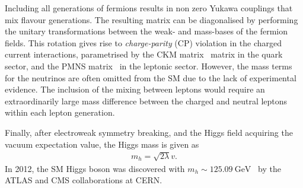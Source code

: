 Including all generations of fermions results in non zero Yukawa couplings that mix flavour generations. The resulting matrix can be diagonalised by performing the unitary transformations between the weak- and mass-bases of the fermion fields. This rotation gives rise to \emph{charge-parity} (CP) violation in the charged current interactions, parametrised by the CKM matrix~\cite{10.1143/PTP.49.652} matrix in the quark sector, and the PMNS matrix~\cite{Maki1962} in the leptonic sector. However, the mass terms for the neutrinos are often omitted from the SM due to the lack of experimental evidence. The inclusion of the mixing between leptons would require an extraordinarily large mass difference between the charged and neutral leptons within each lepton generation. 

Finally, after electroweak symmetry breaking, and the Higgs field acquiring the vacuum expectation value, the Higgs mass is given as
\begin{equation}
    \label{eq:higgsmass}
    \begin{aligned}
        m_h = \sqrt{2\lambda}v.
     \end{aligned}
\end{equation}
In 2012, the SM Higgs boson was discovered with $m_h \sim \SI{125.09}{\giga\electronvolt}$~\cite{Aad_2012,Chatrchyan2012} by the ATLAS and CMS collaborations at CERN. 

